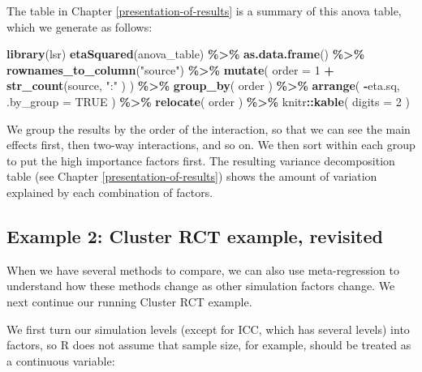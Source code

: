 \documentclass[
]{book}
\newenvironment{Shaded}{\begin{snugshade}}{\end{snugshade}}
\newcommand{\AttributeTok}[1]{\textcolor[rgb]{0.13,0.29,0.53}{#1}}
\newcommand{\ConstantTok}[1]{\textcolor[rgb]{0.56,0.35,0.01}{#1}}
\newcommand{\DecValTok}[1]{\textcolor[rgb]{0.00,0.00,0.81}{#1}}
\newcommand{\FunctionTok}[1]{\textcolor[rgb]{0.13,0.29,0.53}{\textbf{#1}}}
\newcommand{\NormalTok}[1]{#1}
\newcommand{\SpecialCharTok}[1]{\textcolor[rgb]{0.81,0.36,0.00}{\textbf{#1}}}
\newcommand{\StringTok}[1]{\textcolor[rgb]{0.31,0.60,0.02}{#1}}
\begin{document}
The table in Chapter \ref{presentation-of-results} is a summary of this anova table, which we generate as follows:

\begin{Shaded}
\begin{Highlighting}[]
\FunctionTok{library}\NormalTok{(lsr)}
\FunctionTok{etaSquared}\NormalTok{(anova\_table) }\SpecialCharTok{\%\textgreater{}\%}
  \FunctionTok{as.data.frame}\NormalTok{() }\SpecialCharTok{\%\textgreater{}\%}
  \FunctionTok{rownames\_to\_column}\NormalTok{(}\StringTok{"source"}\NormalTok{) }\SpecialCharTok{\%\textgreater{}\%}
  \FunctionTok{mutate}\NormalTok{( }\AttributeTok{order =} \DecValTok{1} \SpecialCharTok{+} \FunctionTok{str\_count}\NormalTok{(source, }\StringTok{":"}\NormalTok{ ) ) }\SpecialCharTok{\%\textgreater{}\%}
  \FunctionTok{group\_by}\NormalTok{( order ) }\SpecialCharTok{\%\textgreater{}\%}
  \FunctionTok{arrange}\NormalTok{( }\SpecialCharTok{{-}}\NormalTok{eta.sq, }\AttributeTok{.by\_group =} \ConstantTok{TRUE}\NormalTok{ ) }\SpecialCharTok{\%\textgreater{}\%}
  \FunctionTok{relocate}\NormalTok{( order ) }\SpecialCharTok{\%\textgreater{}\%}
\NormalTok{  knitr}\SpecialCharTok{::}\FunctionTok{kable}\NormalTok{( }\AttributeTok{digits =} \DecValTok{2}\NormalTok{ )}
\end{Highlighting}
\end{Shaded}

We group the results by the order of the interaction, so that we can see the main effects first, then two-way interactions, and so on.
We then sort within each group to put the high importance factors first.
The resulting variance decomposition table (see Chapter \ref{presentation-of-results}) shows the amount of variation explained by each combination of factors.

\subsection{Example 2: Cluster RCT example, revisited}\label{example-2-cluster-rct-example-revisited}

When we have several methods to compare, we can also use meta-regression to understand how these methods change as other simulation factors change.
We next continue our running Cluster RCT example.

We first turn our simulation levels (except for ICC, which has several levels) into factors, so R does not assume that sample size, for example, should be treated as a continuous variable:
\end{document}
